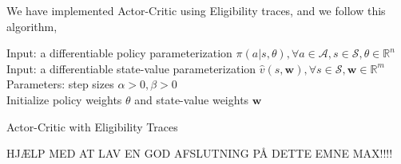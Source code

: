 \documentclass[11pt]{article}
\begin{document}
We have implemented Actor-Critic using Eligibility traces, and we follow this algorithm,\cite{RLbook}
\begin{algorithm}[!h]
\SetAlgoLined
    Input: a differentiable policy parameterization $\pi(a | s, \theta), \forall a \in \mathcal{A}, s \in \mathcal{S}, \theta \in \mathbb{R}^{n}$\\
    Input: a differentiable state-value parameterization  $\hat{v}(s, \mathbf{w}), \forall s \in \mathcal{S}, \mathbf{w} \in \mathbb{R}^{m}$\\
    Parameters: step sizes $\alpha > 0, \beta > 0$ \\
    Initialize policy weights $\theta$ and state-value weights $\mathbf{w}$ 

 \caption{Actor-Critic with Eligibility Traces}
\end{algorithm}

HJÆLP MED AT LAV EN GOD AFSLUTNING PÅ DETTE EMNE MAX!!!!









%
%
\end{document}
